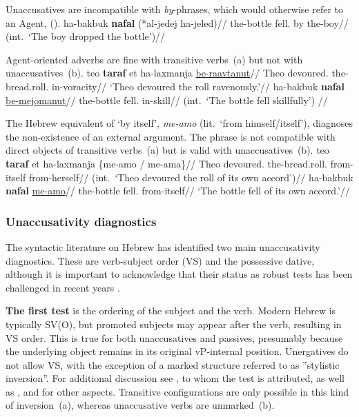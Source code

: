 Unaccusatives are incompatible with \emph{by}-phrases, which would otherwise refer to an Agent, (\nextx).
\ex \begingl
	\gla ha-bakbuk \textbf{nafal} (*al-jedej ha-jeled)//
	\glb the-bottle fell. by the-boy//
	\glft (int.~`The boy dropped the bottle')//
	\endgl
\xe

Agent-oriented adverbs are fine with transitive verbs~(\nextx a) but not with unaccusatives~(\nextx b).
\pex
	\a \begingl
		\gla teo \textbf{taraf} et ha-laxmanja \underline{be-raavtanut}//
		\glb Theo devoured.  the-bread.roll. in-voracity//
		\glft `Theo devoured the roll ravenously.'//
		\endgl
	\a \ljudge{*} \begingl
		\gla ha-bakbuk \textbf{nafal} \underline{be-mejomanut}//
		\glb the-bottle fell. in-skill//
		\glft (int.~`The bottle fell skillfully') //
		\endgl
\xe	

The Hebrew equivalent of `by itself', \emph{me-a{\ts}mo} (lit.~`from himself/itself'), diagnoses the non-existence of an external argument. The phrase is not compatible with direct objects of transitive verbs~(\nextx a) but is valid with unaccusatives~(\nextx b).
\pex
	\a \ljudge{*} \begingl
		\gla teo \textbf{taraf} et ha-laxmanja \{me-a{\ts}mo / me-a{\ts}ma\}//
		\glb Theo devoured.  the-bread.roll. from-itself {} from-herself//
		\glft (int.~`Theo devoured the roll of its own accord')//
		\endgl
	\a \begingl
		\gla ha-bakbuk \textbf{nafal} \underline{me-a{\ts}mo}//
		\glb the-bottle fell. from-itself//
		\glft `The bottle fell of its own accord.'//
		\endgl
\xe


		\subsubsection{Unaccusativity diagnostics} \label{voice:tkal:nact:unacc}
The syntactic literature on Hebrew has identified two main unaccusativity diagnostics. These are verb-subject order (VS) and the possessive dative, although it is important to acknowledge that their status as robust tests has been challenged in recent years \citep{gafter14li,linzen14pd,kastner17gjgl}.

\textbf{The first test} is the ordering of the subject and the verb. Modern Hebrew is typically SV(O), but promoted subjects may appear after the verb, resulting in VS order. This is true for both unaccusatives and passives, presumably because the underlying object remains in its original vP-internal position. Unergatives do not allow VS, with the exception of a marked structure referred to as ''stylistic inversion''. For additional discussion see \cite{shlonsky87}, to whom the test is attributed, as well as \cite{shlonskydoron91}, \cite{borer95} and \cite{preminger10} for other aspects. Transitive configurations are only possible in this kind of inversion~(\nextx a), whereas unaccusative verbs are unmarked~(\nextx b).

